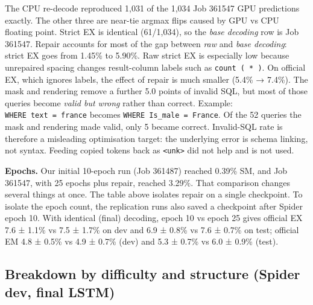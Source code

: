 \documentclass[
  10pt,
]{article}
\begin{document}
The CPU re-decode reproduced 1,031 of the 1,034 Job 361547 GPU
predictions exactly. The other three are near-tie argmax flips caused by
GPU vs CPU floating point. Strict EX is identical (61/1,034), so the
\emph{base decoding} row is Job 361547. Repair accounts for most of the
gap between \emph{raw} and \emph{base decoding}: strict EX goes from
1.45\% to 5.90\%. Raw strict EX is especially low because unrepaired
spacing changes result-column labels such as \texttt{count\ (\ *\ )}. On
official EX, which ignores labels, the effect of repair is much smaller
(5.4\% → 7.4\%). The mask and rendering remove a further 5.0 points of
invalid SQL, but most of those queries become \emph{valid but wrong}
rather than correct. Example:
\texttt{WHERE\ text\ =\ \textquotesingle{}france\textquotesingle{}}
becomes
\texttt{WHERE\ Is\_male\ =\ \textquotesingle{}France\textquotesingle{}}.
Of the 52 queries the mask and rendering made valid, only 5 became
correct. Invalid-SQL rate is therefore a misleading optimisation target:
the underlying error is schema linking, not syntax. Feeding copied
tokens back as \texttt{\textless{}unk\textgreater{}} did not help and is
not used.

\textbf{Epochs.} Our initial 10-epoch run (Job 361487) reached 0.39\%
SM, and Job 361547, with 25 epochs plus repair, reached 3.29\%. That
comparison changes several things at once. The table above isolates
repair on a single checkpoint. To isolate the epoch count, the
replication runs also saved a checkpoint after Spider epoch 10. With
identical (final) decoding, epoch 10 vs epoch 25 gives official EX 7.6 ±
1.1\% vs 7.5 ± 1.7\% on dev and 6.9 ± 0.8\% vs 7.6 ± 0.7\% on test;
official EM 4.8 ± 0.5\% vs 4.9 ± 0.7\% (dev) and 5.3 ± 0.7\% vs 6.0 ±
0.9\% (test).

\subsection{Breakdown by difficulty and structure (Spider dev, final
LSTM)}\label{breakdown-by-difficulty-and-structure-spider-dev-final-lstm}
\end{document}
